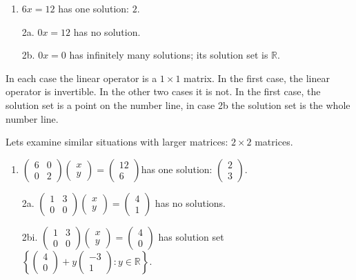 \begin{enumerate}
\item $6x=12$ has one solution: $2$.
\item[2a.] $0x=12$ has no solution.
\item[2b.] $0x=0$ has infinitely many solutions; its solution set is $\mathbb{R}$.
\end{enumerate}
In each case the linear operator is a $1\times 1$ matrix. In the first case, the linear operator is invertible. 
In the other two cases it is not. 
In the first case, the solution set is a point on the number line, in  case 2b the solution set is the whole number line.

Lets examine similar situations with larger matrices: $2\times 2$ matrices.
\begin{enumerate}
\item
$\begin{pmatrix}
6	&0 	\\
0 	&2 	
\end{pmatrix} 
\begin{pmatrix}
 x \\ 
y 
\end{pmatrix} 
=
\begin{pmatrix}
12 \\ 
6
\end{pmatrix}$has  one solution: 
$\begin{pmatrix}
2 \\ 
3
\end{pmatrix}.$

\item[2a.] 
$\begin{pmatrix}
1	&3 	\\
0 	&0 	
\end{pmatrix} 
\begin{pmatrix}
 x \\ 
y 
\end{pmatrix} 
=
\begin{pmatrix}
4 \\ 
1 
\end{pmatrix}$ has no solutions.

\item[2bi.]
$\begin{pmatrix}
1	&3 	\\
0 	&0 	
\end{pmatrix} 
\begin{pmatrix}
 x \\ 
y 
\end{pmatrix} 
=
\begin{pmatrix}
4 \\ 
0
\end{pmatrix} $ has solution set 
$\left \{ 
\left(\begin{array}{c}
4 \\ 
0
\end{array} \right)
+
y\left(\begin{array}{c}
-3 \\ 
1
\end{array} \right)
: y\in \mathbb{R} \right\}.$


\end{enumerate}
